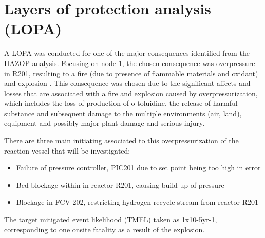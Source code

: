 \section{Layers of protection analysis (LOPA)}

A LOPA was conducted for one of the major consequences identified from the HAZOP analysis. Focusing on node 1, the chosen consequence was overpressure in R201, resulting to a fire (due to presence of flammable materials and oxidant) and explosion . This consequence was chosen due to the significant affects and losses that are associated with a fire and explosion caused by overpressurization, which includes the loss of production of o-toluidine, the release of harmful substance and subsequent damage to the multiple environments (air, land), equipment and possibly major plant damage and serious injury. 

There are three main initiating associated to this overpressurization of the reaction vessel that will be investigated;

\begin{itemize}
\item Failure of pressure controller, PIC201 due to set point being too high in error
\item Bed blockage within in reactor R201, causing build up of pressure
\item Blockage in FCV-202, restricting hydrogen recycle stream from reactor R201

\end{itemize}


The target mitigated event likelihood (TMEL) taken as 1x10-5yr-1, corresponding to one onsite fatality as a result of the explosion. 

 